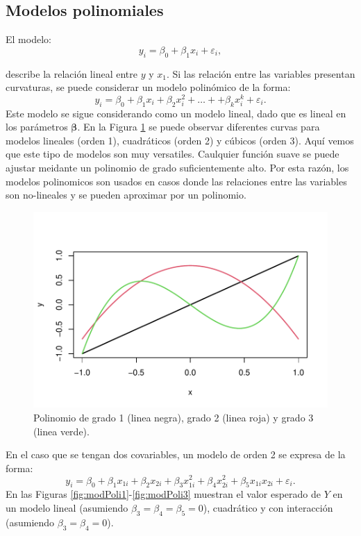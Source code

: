 \documentclass[
]{article}
\begin{document}
\hypertarget{modelos-polinomiales-1}{%
\subsection{Modelos polinomiales}\label{modelos-polinomiales-1}}

El modelo:
\[
y_{i} = \beta_{0} + \beta_{1}x_{i} + \varepsilon_i,
\]

describe la relación lineal entre \(y\) y \(x_1\). Si las relación entre las variables presentan curvaturas, se puede considerar un modelo polinómico de la forma:
\[
y_{i} = \beta_{0} + \beta_{1}x_{i} + \beta_{2}x_{i}^{2} + \ldots + + \beta_{k}x_{i}^{k} + \varepsilon_i.
\]
Este modelo se sigue considerando como un modelo lineal, dado que es lineal en los parámetros \(\boldsymbol \beta\). En la Figura \ref{fig:Polinomios} se puede observar diferentes curvas para modelos lineales (orden 1), cuadráticos (orden 2) y cúbicos (orden 3). Aquí vemos que este tipo de modelos son muy versatiles. Caulquier función suave se puede ajustar meidante un polinomio de grado suficientemente alto. Por esta razón, los modelos polinomicos son usados en casos donde las relaciones entre las variables son no-lineales y se pueden aproximar por un polinomio.

\begin{figure}

{\centering \includegraphics{MLG2_files/figure-latex/Polinomios-1} 

}

\caption{Polinomio de grado 1 (linea negra), grado 2 (linea roja) y grado 3 (linea verde).}\label{fig:Polinomios}
\end{figure}

En el caso que se tengan dos covariables, un modelo de orden 2 se expresa de la forma:
\[
y_{i} = \beta_{0} + \beta_{1}x_{1i} + \beta_{2}x_{2i} + \beta_{3}x_{1i}^2 + \beta_{4}x_{2i}^2 + \beta_{5}x_{1i}x_{2i} + \varepsilon_i.
\]
En las Figuras \ref{fig:modPoli1}-\ref{fig:modPoli3} muestran el valor esperado de \(Y\) en un modelo lineal (asumiendo \(\beta_3=\beta_4=\beta_5=0\)), cuadrático y con interacción (asumiendo \(\beta_3=\beta_4=0\)).
\end{document}
